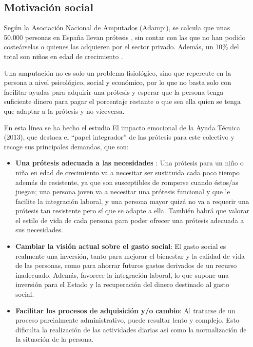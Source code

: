 \subsection{Motivación social}
\label{sub:Motivación-social}

Según la Asociación Nacional de Amputados (Adampi), se calcula que unas 50.000
personas en España llevan prótesis \cite{mundo-10-barbaridad}, sin contar con las que no han podido
costeárselas o quienes las adquieren por el sector privado. Además, un 10\% del
total son niños en edad de crecimiento \cite{abc-olvidados}.

Una amputación no es solo un problema fisiológico, sino que repercute en la
persona a nivel psicológico, social y económico, por lo que no basta solo con
facilitar ayudas para adquirir una prótesis y esperar que la persona tenga
suficiente dinero para pagar el porcentaje restante o que sea ella quien se
tenga que adaptar a la prótesis y no viceversa.

En esta línea se ha hecho el estudio El impacto emocional de la Ayuda Técnica
(2013), que destaca el ``papel integrador'' de las prótesis para este colectivo
y recoge sus principales demandas, que son:

\begin{itemize}
  \item \textbf{Una prótesis adecuada a las necesidades} : Una prótesis para un
	niño o niña en edad de crecimiento va a necesitar ser sustituida cada poco tiempo
	además de resistente, ya que son susceptibles de romperse cuando éstos/as
	juegan; una persona joven va a necesitar una prótesis funcional y que le
	facilite la integración laboral, y una persona mayor quizá no va a requerir
	una prótesis tan resistente pero sí que se adapte a ella. También habrá que
	valorar el estilo de vida de cada persona para poder ofrecer una prótesis
	adecuada a sus necesidades.

  \item \textbf{Cambiar la visión actual sobre el gasto social}: El gasto social
  	es realmente una inversión, tanto para mejorar el bienestar y la calidad de
	vida de las personas, como para ahorrar futuros gastos derivados de un
	recurso inadecuado. Además, favorece la integración laboral, lo que supone
	una inversión para el Estado y la recuperación del dinero destinado al gasto
	social.

  \item \textbf{Facilitar los procesos de adquisición y/o cambio}: Al tratarse
  	de un proceso parcialmente administrativo, puede resultar lento y complejo.
	Esto dificulta la realización de las actividades diarias así como la
	normalización de la situación de la persona.

\end{itemize}

